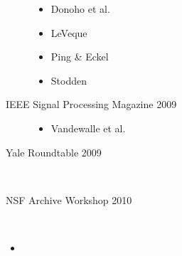 \begin{frame}
\begin{minipage}{0.65\textwidth}
\begin{description}
\begin{itemize}
    \item Donoho et al.
    \item LeVeque
    \item Ping \& Eckel
    \item Stodden
    \end{itemize}
    \item[IEEE Signal Processing Magazine 2009] 
    \begin{itemize}
    \item Vandewalle et al.
     \end{itemize}
     \item[Yale Roundtable 2009] \
     \item[NSF Archive Workshop 2010] \ 
   \end{description}
  \end{minipage}

\vfill

\begin{itemize}
\item {}
\end{itemize}

\end{frame}

